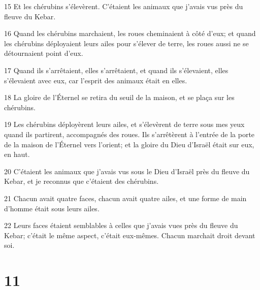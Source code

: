 \par 15 Et les chérubins s'élevèrent. C'étaient les animaux que j'avais vus près du fleuve du Kebar.
\par 16 Quand les chérubins marchaient, les roues cheminaient à côté d'eux; et quand les chérubins déployaient leurs ailes pour s'élever de terre, les roues aussi ne se détournaient point d'eux.
\par 17 Quand ils s'arrêtaient, elles s'arrêtaient, et quand ils s'élevaient, elles s'élevaient avec eux, car l'esprit des animaux était en elles.
\par 18 La gloire de l'Éternel se retira du seuil de la maison, et se plaça sur les chérubins.
\par 19 Les chérubins déployèrent leurs ailes, et s'élevèrent de terre sous mes yeux quand ils partirent, accompagnés des roues. Ils s'arrêtèrent à l'entrée de la porte de la maison de l'Éternel vers l'orient; et la gloire du Dieu d'Israël était sur eux, en haut.
\par 20 C'étaient les animaux que j'avais vus sous le Dieu d'Israël près du fleuve du Kebar, et je reconnus que c'étaient des chérubins.
\par 21 Chacun avait quatre faces, chacun avait quatre ailes, et une forme de main d'homme était sous leurs ailes.
\par 22 Leurs faces étaient semblables à celles que j'avais vues près du fleuve du Kebar; c'était le même aspect, c'était eux-mêmes. Chacun marchait droit devant soi.

\chapter{11}

